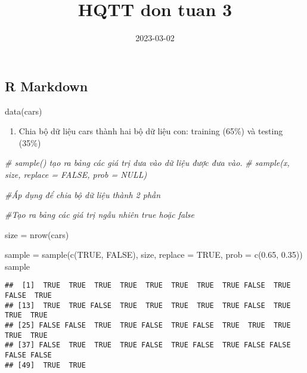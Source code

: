 \documentclass[
]{article}
\title{HQTT don tuan 3}
\author{}
\date{\vspace{-2.5em}2023-03-02}
\newenvironment{Shaded}{\begin{snugshade}}{\end{snugshade}}
\newcommand{\AttributeTok}[1]{\textcolor[rgb]{0.77,0.63,0.00}{#1}}
\newcommand{\CommentTok}[1]{\textcolor[rgb]{0.56,0.35,0.01}{\textit{#1}}}
\newcommand{\ConstantTok}[1]{\textcolor[rgb]{0.00,0.00,0.00}{#1}}
\newcommand{\FloatTok}[1]{\textcolor[rgb]{0.00,0.00,0.81}{#1}}
\newcommand{\FunctionTok}[1]{\textcolor[rgb]{0.00,0.00,0.00}{#1}}
\newcommand{\NormalTok}[1]{#1}
\newcommand{\OtherTok}[1]{\textcolor[rgb]{0.56,0.35,0.01}{#1}}
\providecommand{\tightlist}{%
  \setlength{\itemsep}{0pt}\setlength{\parskip}{0pt}}
\begin{document}
\maketitle

\hypertarget{r-markdown}{%
\subsection{R Markdown}\label{r-markdown}}

\begin{Shaded}
\begin{Highlighting}[]
\FunctionTok{data}\NormalTok{(cars)}
\end{Highlighting}
\end{Shaded}

\begin{enumerate}
\def\labelenumi{\arabic{enumi}.}
\tightlist
\item
  Chia bộ dữ liệu cars thành hai bộ dữ liệu con: training (65\%) và
  testing (35\%)
\end{enumerate}

\begin{Shaded}
\begin{Highlighting}[]
\CommentTok{\# sample() tạo ra bảng các giá trị dưa vào dữ liệu được đưa vào.}
\CommentTok{\# sample(x, size, replace = FALSE, prob = NULL)}


\CommentTok{\#Áp dụng để chia bộ dữ liệu thành 2 phần}

\CommentTok{\#Tạo ra bảng các giá trị ngẫu nhiên true hoặc false}

\NormalTok{size }\OtherTok{=} \FunctionTok{nrow}\NormalTok{(cars) }

\NormalTok{sample }\OtherTok{=} \FunctionTok{sample}\NormalTok{(}\FunctionTok{c}\NormalTok{(}\ConstantTok{TRUE}\NormalTok{, }\ConstantTok{FALSE}\NormalTok{), size, }\AttributeTok{replace =} \ConstantTok{TRUE}\NormalTok{, }\AttributeTok{prob =} \FunctionTok{c}\NormalTok{(}\FloatTok{0.65}\NormalTok{, }\FloatTok{0.35}\NormalTok{))}
\NormalTok{sample}
\end{Highlighting}
\end{Shaded}

\begin{verbatim}
##  [1]  TRUE  TRUE  TRUE  TRUE  TRUE  TRUE  TRUE  TRUE FALSE  TRUE FALSE  TRUE
## [13]  TRUE  TRUE FALSE  TRUE  TRUE  TRUE  TRUE  TRUE FALSE  TRUE  TRUE  TRUE
## [25] FALSE FALSE  TRUE  TRUE FALSE  TRUE FALSE  TRUE  TRUE  TRUE  TRUE  TRUE
## [37] FALSE  TRUE  TRUE  TRUE FALSE  TRUE FALSE  TRUE FALSE FALSE FALSE FALSE
## [49]  TRUE  TRUE
\end{verbatim}
\end{document}
